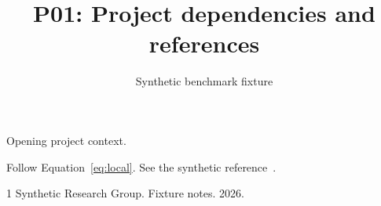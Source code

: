 \documentclass{article}
\title{P01: Project dependencies and references}
\author{Synthetic benchmark fixture}
\date{}
\begin{document}
\maketitle
Opening project context.

Follow Equation~\eqref{eq:local}. See the synthetic reference~\cite{fixture}.
\begin{thebibliography}{1}
 Synthetic Research Group. Fixture notes. 2026.
\end{thebibliography}
\end{document}
